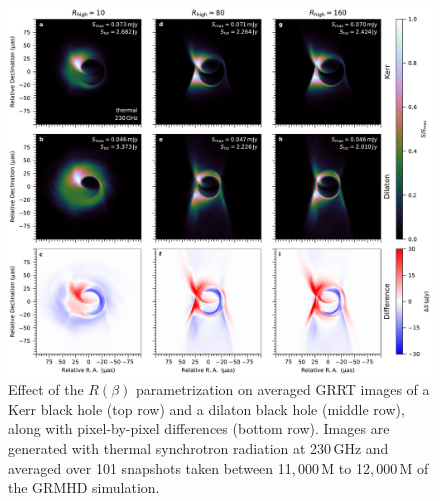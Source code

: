 \documentclass[a4paper,11pt]{article}
\begin{document}
\begin{figure}[h!]
	\centering
	\includegraphics[width=\textwidth]{proc_SgrA_SANE_a06_230GHz_Rh1_i60_ovpl.pdf}
	\caption{Effect of the $R(\beta)$ parametrization on averaged GRRT images of a Kerr black hole (top row) and a dilaton black hole (middle row), along with pixel-by-pixel differences (bottom row). Images are generated with thermal synchrotron radiation at 230\,GHz and averaged over 101 snapshots taken between 11,\,000\,M to 12,\,000\,M of the GRMHD simulation.}
	\label{fig:GRRT}
\end{figure} 
\end{document}
